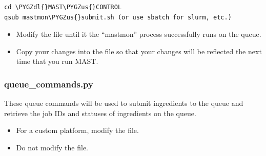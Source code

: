 \documentclass[letterpaper,10pt,english]{sphinxmanual}
\def\PYGZus{\char`\_}
\def\PYGZdl{\char`\$}
\begin{document}
\begin{Verbatim}[commandchars=\\\{\}]
cd \PYGZdl{}MAST\PYGZus{}CONTROL
qsub mastmon\PYGZus{}submit.sh (or use sbatch for slurm, etc.)
\end{Verbatim}
\begin{itemize}
\item {} 
Modify the  file until it the ``mastmon'' process successfully runs on the queue.

\item {} 
Copy your changes into the  file so that your changes will be reflected the next time that you run MAST.

\end{itemize}


\subsubsection{queue\_commands.py}
\label{1_0_installation:queue-commands-py}
These queue commands will be used to submit ingredients to the queue and retrieve the job IDs and statuses of ingredients on the queue.
\begin{itemize}
\item {} 
For a custom platform, modify the  file.

\item {} 
Do not modify the  file.

\end{itemize}
\end{document}

